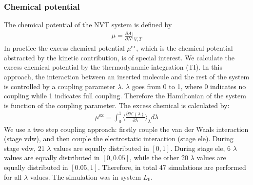 \documentclass[aip,jcp,a4paper,preprint,unsortedaddress,onecolumn,fleqn]{revtex4-1}
\newcommand{\exc}{\textrm{ex}}
\newcommand{\systemla}{L_0}
\begin{document}
\subsubsection{Chemical potential}

The chemical potential of the NVT system is defined by
\begin{align}
  \mu = \frac{\partial A}{\partial N}\Big\vert_{V,T}
\end{align}
In practice the excess chemical potential $\mu^\exc$, which is the
chemical potential abstracted by the kinetic contribution, is of
special interest. We calculate the excess chemical potential by the
thermodynamic integration (TI). In this approach, the interaction
between an inserted molecule and the rest of the system is controlled
by a coupling parameter $\lambda$. $\lambda$ goes from 0 to 1, where 0
indicates no coupling while 1 indicates full coupling. Therefore the
Hamiltonian of the system is function of the coupling parameter. The
excess chemical is calculated by:
\begin{align}
  \mu^\exc = \int_0^1 \Big\langle \frac{\partial \mathcal H(\lambda)}{\partial \lambda} \Big\rangle_\lambda d\lambda
\end{align}
We use a two step coupling approach: firstly couple the van der Waals
interaction (stage vdw), and then couple the electrostatic interaction
(stage ele).  During stage vdw, 21 $\lambda$ values are equally
distributed in $[0,1]$.  During stage ele, 6 $\lambda$ values are
equally distributed in $[0,0.05]$, while the other 20 $\lambda$ values
are equally distributed in $[0.05, 1]$. Therefore, in total 47
simulations are performed for all $\lambda$ values. The simulation was
in system $\systemla$.
\end{document}
